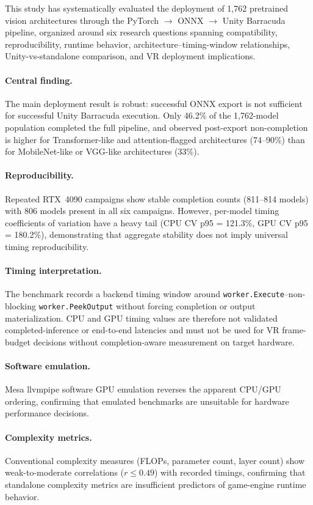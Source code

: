 \documentclass[10pt,twocolumn]{article}
\begin{document}
This study has systematically evaluated the deployment of 1,762 pretrained vision architectures through the PyTorch $\rightarrow$ ONNX $\rightarrow$ Unity Barracuda pipeline, organized around six research questions spanning compatibility, reproducibility, runtime behavior, architecture--timing-window relationships, Unity-vs-standalone comparison, and VR deployment implications.

\paragraph{Central finding.}
The main deployment result is robust: successful ONNX export is not sufficient for successful Unity Barracuda execution. Only 46.2\% of the 1,762-model population completed the full pipeline, and observed post-export non-completion is higher for Transformer-like and attention-flagged architectures (74--90\%) than for MobileNet-like or VGG-like architectures (33\%).

\paragraph{Reproducibility.}
Repeated RTX~4090 campaigns show stable completion counts (811--814 models) with 806 models present in all six campaigns. However, per-model timing coefficients of variation have a heavy tail (CPU CV p95 = 121.3\%, GPU CV p95 = 180.2\%), demonstrating that aggregate stability does not imply universal timing reproducibility.

\paragraph{Timing interpretation.}
The benchmark records a backend timing window around \texttt{worker.Execute}--non-blocking \texttt{worker.PeekOutput} without forcing completion or output materialization. CPU and GPU timing values are therefore not validated completed-inference or end-to-end latencies and must not be used for VR frame-budget decisions without completion-aware measurement on target hardware.

\paragraph{Software emulation.}
Mesa llvmpipe software GPU emulation reverses the apparent CPU/GPU ordering, confirming that emulated benchmarks are unsuitable for hardware performance decisions.

\paragraph{Complexity metrics.}
Conventional complexity measures (FLOPs, parameter count, layer count) show weak-to-moderate correlations ($r \leq 0.49$) with recorded timings, confirming that standalone complexity metrics are insufficient predictors of game-engine runtime behavior.
\end{document}
